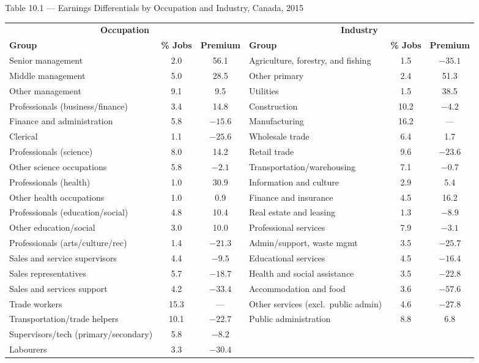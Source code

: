 \documentclass[aspectratio=169]{beamer}
\begin{document}
\begin{frame}{Table 10.1 — Earnings Differentials by Occupation and Industry, Canada, 2015}
\transfade
\scriptsize
\begin{tabular}{lcc|lcc}
\toprule
\multicolumn{3}{c}{\textbf{Occupation}} & \multicolumn{3}{c}{\textbf{Industry}} \\
\textbf{Group} & \textbf{\% Jobs} & \textbf{Premium} & \textbf{Group} & \textbf{\% Jobs} & \textbf{Premium} \\
\midrule
Senior management & 2.0 & 56.1 & Agriculture, forestry, and fishing & 1.5 & $-35.1$ \\
Middle management & 5.0 & 28.5 & Other primary & 2.4 & 51.3 \\
Other management & 9.1 & 9.5 & Utilities & 1.5 & 38.5 \\
Professionals (business/finance) & 3.4 & 14.8 & Construction & 10.2 & $-4.2$ \\
Finance and administration & 5.8 & $-15.6$ & Manufacturing & 16.2 & --- \\
Clerical & 1.1 & $-25.6$ & Wholesale trade & 6.4 & 1.7 \\
Professionals (science) & 8.0 & 14.2 & Retail trade & 9.6 & $-23.6$ \\
Other science occupations & 5.8 & $-2.1$ & Transportation/warehousing & 7.1 & $-0.7$ \\
Professionals (health) & 1.0 & 30.9 & Information and culture & 2.9 & 5.4 \\
Other health occupations & 1.0 & 0.9 & Finance and insurance & 4.5 & 16.2 \\
Professionals (education/social) & 4.8 & 10.4 & Real estate and leasing & 1.3 & $-8.9$ \\
Other education/social & 3.0 & 10.0 & Professional services & 7.9 & $-3.1$ \\
Professionals (arts/culture/rec) & 1.4 & $-21.3$ & Admin/support, waste mgmt & 3.5 & $-25.7$ \\
Sales and service supervisors & 4.4 & $-9.5$ & Educational services & 4.5 & $-16.4$ \\
Sales representatives & 5.7 & $-18.7$ & Health and social assistance & 3.5 & $-22.8$ \\
Sales and services support & 4.2 & $-33.4$ & Accommodation and food & 3.6 & $-57.6$ \\
Trade workers & 15.3 & --- & Other services (excl.\ public admin) & 4.6 & $-27.8$ \\
Transportation/trade helpers & 10.1 & $-22.7$ & Public administration & 8.8 & 6.8 \\
Supervisors/tech (primary/secondary) & 5.8 & $-8.2$ &  &  &  \\
Labourers & 3.3 & $-30.4$ &  &  &  \\
\bottomrule
\end{tabular}
\end{frame}
\end{document}
